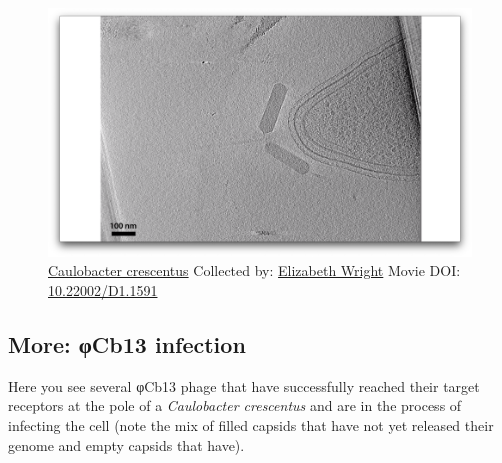 \documentclass[]{tufte-book}
\begin{document}
\begin{figure}
\includegraphics{movie_stills/10_6} \caption[\protect\hyperlink{tree}{Caulobacter crescentus} Collected
by: \protect\hyperlink{elizabeth_wright}{Elizabeth Wright} Movie DOI:
\href{https://doi.org/10.22002/D1.1591}{10.22002/D1.1591}]{\protect\hyperlink{tree}{Caulobacter crescentus} Collected
by: \protect\hyperlink{elizabeth_wright}{Elizabeth Wright} Movie DOI:
\href{https://doi.org/10.22002/D1.1591}{10.22002/D1.1591}}\label{fig:10-6}
\end{figure}

\hypertarget{ux3c6Cb13_infection}{\subsection*{More: φCb13
infection}\label{ux3c6Cb13_infection}}

Here you see several φCb13 phage that have successfully reached their
target receptors at the pole of a \emph{Caulobacter crescentus} and are
in the process of infecting the cell (note the mix of filled capsids
that have not yet released their genome and empty capsids that have).
\end{document}
